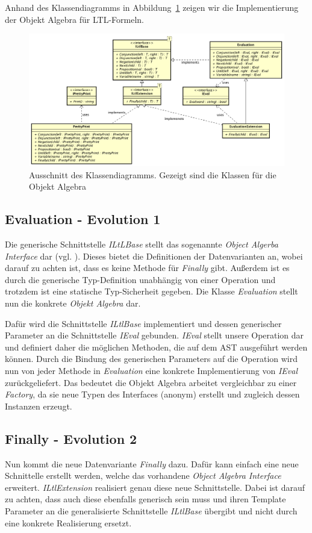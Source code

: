 \documentclass{llncs}
\begin{document}
Anhand des Klassendiagramms in Abbildung~\ref{fig:object-algebra} zeigen wir die Implementierung der Objekt Algebra für LTL-Formeln.

\begin{figure}
	\centering
	\includegraphics[width=\textwidth]{images/ObjectAlgebra.png}
	\caption{Ausschnitt des Klassendiagramms. Gezeigt sind die Klassen für die Objekt Algebra}
	\label{fig:object-algebra}
\end{figure}

\subsection{Evaluation - Evolution 1}
Die generische Schnittstelle \emph{ILtLBase} stellt das sogenannte \emph{Object Algerba Interface} dar (vgl. \cite[Abschnitt 3 S.6]{Oliveira12}).
Dieses bietet die Definitionen der Datenvarianten an, wobei darauf zu achten ist, dass es keine Methode für \emph{Finally} gibt.
Außerdem ist es durch die generische Typ-Definition unabhängig von einer Operation und trotzdem ist eine statische Typ-Sicherheit gegeben.
Die Klasse \emph{Evaluation} stellt nun die konkrete \emph{Objekt Algebra} dar.

Dafür wird die Schnittstelle \emph{ILtlBase} implementiert und dessen generischer Parameter an die Schnittstelle \emph{IEval} gebunden.
\emph{IEval} stellt unsere Operation dar und definiert daher die möglichen Methoden, die auf dem AST ausgeführt werden können.
Durch die Bindung des generischen Parameters auf die Operation wird nun von jeder Methode in \emph{Evaluation} eine konkrete Implementierung von \emph{IEval} zurückgeliefert.
Das bedeutet die Objekt Algebra arbeitet vergleichbar zu einer \emph{Factory}, da sie neue Typen des Interfaces (anonym) erstellt und zugleich dessen Instanzen erzeugt.

\subsection{Finally - Evolution 2}
Nun kommt die neue Datenvariante \emph{Finally} dazu. Dafür kann einfach eine neue Schnittelle erstellt werden, welche das vorhandene \emph{Object Algebra Interface} erweitert.
\emph{ILtlExtension} realisiert genau diese neue Schnittstelle. Dabei ist darauf zu achten,
dass auch diese ebenfalls generisch sein muss und ihren Template Parameter an die generalisierte Schnittstelle \emph{ILtlBase} übergibt und nicht durch eine konkrete Realisierung ersetzt.
\end{document}
